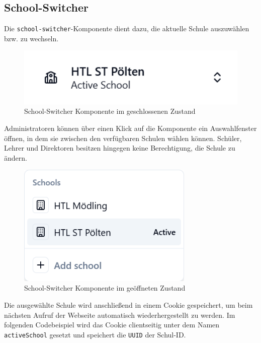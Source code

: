 \begin{inhalt}
\begin{enumerate}[label=\textbf{\arabic*.}]
\newpage

\subsection{School-Switcher}

Die \texttt{school-switcher}-Komponente dient dazu, die aktuelle Schule auszuwählen bzw. zu wechseln.

\begin{figure}[!htb]
\centering
\includegraphics[width=1\textwidth]{files/Thomas/pics/Website/Sidebar/school-switcher/school-switcher.png}
\caption[School-Switcher Komponente geschlossen]{School-Switcher Komponente im geschlossenen Zustand}
\label{fig:school_switcher_closed}
\end{figure}

Administratoren können über einen Klick auf die Komponente ein Auswahlfenster öffnen, in dem sie zwischen den verfügbaren Schulen wählen können.  
Schüler, Lehrer und Direktoren besitzen hingegen keine Berechtigung, die Schule zu ändern.

\begin{figure}[!htb]
\centering
\includegraphics[width=0.75\textwidth]{files/Thomas/pics/Website/Sidebar/school-switcher/school-switcher-open.png}
\caption[School-Switcher geöffnet]{School-Switcher Komponente im geöffneten Zustand}
\label{fig:school_switcher_open}
\end{figure}

Die ausgewählte Schule wird anschließend in einem Cookie gespeichert, um beim nächsten Aufruf der Webseite automatisch wiederhergestellt zu werden.  
Im folgenden Codebeispiel wird das Cookie clientseitig unter dem Namen \texttt{activeSchool} gesetzt und speichert die \texttt{UUID} der Schul-ID.


\end{enumerate}
\end{inhalt}
